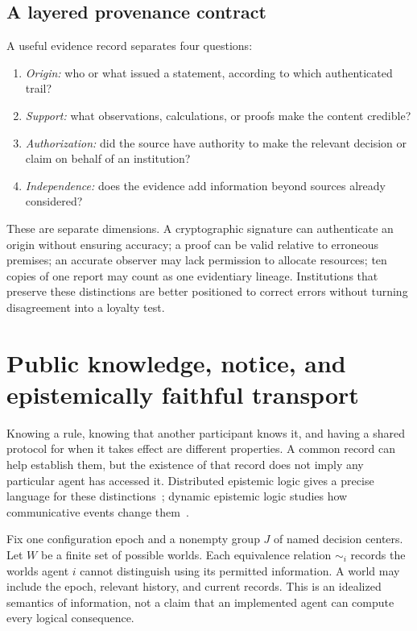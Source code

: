 \documentclass[11pt,letterpaper]{article}
\theoremstyle{plain}
\theoremstyle{definition}
\theoremstyle{remark}
\begin{document}
\subsection{A layered provenance contract}

A useful evidence record separates four questions:
\begin{enumerate}[label=(\roman*),leftmargin=2.1em]
\item \emph{Origin:} who or what issued a statement, according to which authenticated trail?
\item \emph{Support:} what observations, calculations, or proofs make the content credible?
\item \emph{Authorization:} did the source have authority to make the relevant decision or claim on behalf of an institution?
\item \emph{Independence:} does the evidence add information beyond sources already considered?
\end{enumerate}
These are separate dimensions. A cryptographic signature can authenticate an origin without ensuring accuracy; a proof can be valid relative to erroneous premises; an accurate observer may lack permission to allocate resources; ten copies of one report may count as one evidentiary lineage. Institutions that preserve these distinctions are better positioned to correct errors without turning disagreement into a loyalty test.


\section{Public knowledge, notice, and epistemically faithful transport}\label{sec:publicknowledge}
Knowing a rule, knowing that another participant knows it, and having a shared protocol for when it takes effect are different properties. A common record can help establish them, but the existence of that record does not imply any particular agent has accessed it. Distributed epistemic logic gives a precise language for these distinctions~\cite{halpernmoses}; dynamic epistemic logic studies how communicative events change them~\cite{baltag}.

Fix one configuration epoch and a nonempty group $J$ of named decision centers. Let $W$ be a finite set of possible worlds. Each equivalence relation $\sim_i$ records the worlds agent $i$ cannot distinguish using its permitted information. A world may include the epoch, relevant history, and current records. This is an idealized semantics of information, not a claim that an implemented agent can compute every logical consequence.
\end{document}
